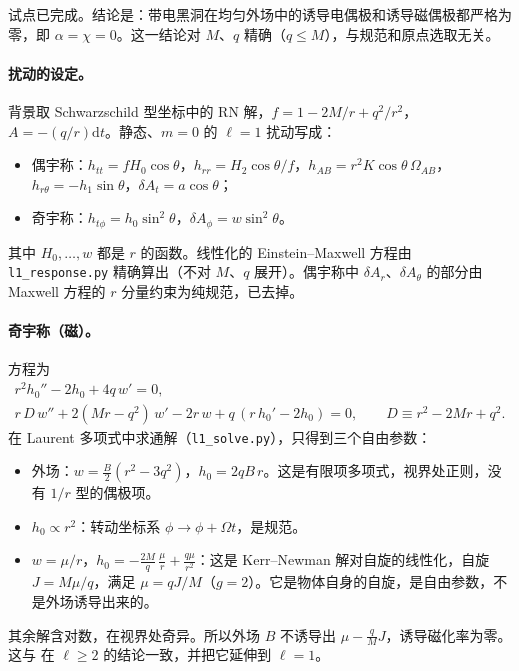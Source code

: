 \documentclass[11pt,a4paper]{ctexart}
\numberwithin{equation}{section}
\newcommand{\dd}{\mathrm d}
\begin{document}
试点已完成。结论是：带电黑洞在均匀外场中的诱导电偶极和诱导磁偶极都严格为零，即 $\alpha=\chi=0$。这一结论对 $M$、$q$ 精确（$q\leq M$），与规范和原点选取无关。

\paragraph{扰动的设定。}背景取 Schwarzschild 型坐标中的 RN 解，$f=1-2M/r+q^2/r^2$，$A=-(q/r)\dd t$。静态、$m=0$ 的 $\ell=1$ 扰动写成：
\begin{itemize}
\item 偶宇称：$h_{tt}=fH_0\cos\theta$，$h_{rr}=H_2\cos\theta/f$，$h_{AB}=r^2K\cos\theta\,\Omega_{AB}$，$h_{r\theta}=-h_1\sin\theta$，$\delta A_t=a\cos\theta$；
\item 奇宇称：$h_{t\phi}=h_0\sin^2\theta$，$\delta A_\phi=w\sin^2\theta$。
\end{itemize}
其中 $H_0,\dots,w$ 都是 $r$ 的函数。线性化的 Einstein--Maxwell 方程由 \texttt{l1\_response.py} 精确算出（不对 $M$、$q$ 展开）。偶宇称中 $\delta A_r$、$\delta A_\theta$ 的部分由 Maxwell 方程的 $r$ 分量约束为纯规范，已去掉。

\paragraph{奇宇称（磁）。}方程为
\begin{gather*}
r^2h_0''-2h_0+4q\,w'=0,\\
r\,D\,w''+2(Mr-q^2)\,w'-2r\,w+q\,(r\,h_0'-2h_0)=0,\qquad D\equiv r^2-2Mr+q^2 .
\end{gather*}
在 Laurent 多项式中求通解（\texttt{l1\_solve.py}），只得到三个自由参数：
\begin{itemize}
\item 外场：$w=\tfrac B2(r^2-3q^2)$，$h_0=2qB\,r$。这是有限项多项式，视界处正则，没有 $1/r$ 型的偶极项。
\item $h_0\propto r^2$：转动坐标系 $\phi\to\phi+\Omega t$，是规范。
\item $w=\mu/r$，$h_0=-\tfrac{2M}{q}\,\tfrac\mu r+\tfrac{q\mu}{r^2}$：这是 Kerr--Newman 解对自旋的线性化，自旋 $J=M\mu/q$，满足 $\mu=qJ/M$（$g=2$）。它是物体自身的自旋，是自由参数，不是外场诱导出来的。
\end{itemize}
其余解含对数，在视界处奇异。所以外场 $B$ 不诱导出 $\mu-\tfrac qMJ$，诱导磁化率为零。这与 \citet{PereniguezCardoso2022} 在 $\ell\geq2$ 的结论一致，并把它延伸到 $\ell=1$。
\end{document}
